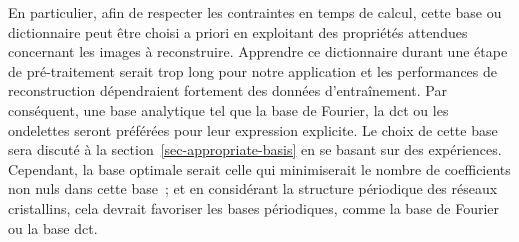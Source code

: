 En particulier, afin de respecter les contraintes en temps de calcul, cette base ou dictionnaire peut être choisi a priori en exploitant des propriétés attendues concernant les images à reconstruire. Apprendre ce dictionnaire durant une étape de pré-traitement serait trop long pour notre application et les performances de reconstruction dépendraient fortement des données d'entraînement. Par conséquent, une base analytique tel que la base de Fourier, la \gls{dct} ou les ondelettes seront préférées pour leur expression explicite. Le choix de cette base sera discuté à la section~\ref{sec-appropriate-basis} en se basant sur des expériences.
%
Cependant, la base optimale serait celle qui minimiserait le nombre de coefficients non nuls dans cette base~; et en considérant la structure périodique des réseaux cristallins, cela devrait favoriser les bases périodiques, comme la base de Fourier ou la base \gls{dct}. 

